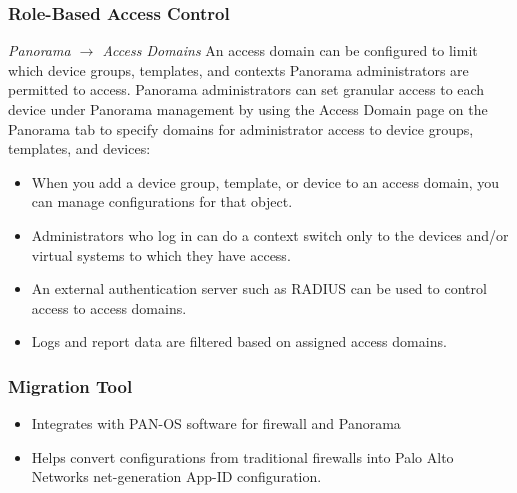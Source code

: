 \subsubsection{Role-Based Access Control}
\textit{Panorama $\rightarrow$ Access Domains}
\newline
An access domain can be configured to limit which device groups, templates, and contexts Panorama administrators are permitted to access.
Panorama administrators can set granular access to each device under Panorama management by using the Access Domain page on the Panorama tab to specify domains for administrator access to device groups, templates, and devices:
\begin{itemize}
    \item When you add a device group, template, or device to an access domain, you can manage configurations for that object.
    \item Administrators who log in can do a context switch only to the devices and/or virtual systems to which they have access.
    \item An external authentication server such as RADIUS can be used to control access to access domains.
    \item Logs and report data are filtered based on assigned access domains.
\end{itemize}

\subsubsection{Migration Tool}
\begin{itemize}
    \item Integrates with PAN-OS software for firewall and Panorama
    \item Helps convert configurations from traditional firewalls into Palo Alto Networks net-generation App-ID configuration.
\end{itemize}